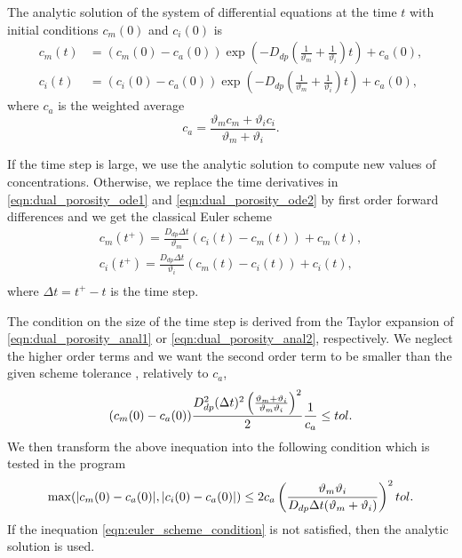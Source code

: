 The analytic solution of the system of differential equations at the time $t$ with initial conditions $c_m(0)$ and $c_i(0)$ is
\begin{align}
     c_m(t) &= (c_m(0) - c_a(0)) \exp\left(- D_{dp}\left(\frac{1}{\vartheta_m} + \frac{1}{\vartheta_i}\right) t \right) + c_a(0), 
     \label{eqn:dual_porosity_anal1}\\
     c_i(t) &= (c_i(0) - c_a(0)) \exp\left(- D_{dp}\left(\frac{1}{\vartheta_m} + \frac{1}{\vartheta_i}\right) t \right) + c_a(0),
     \label{eqn:dual_porosity_anal2}
\end{align}
where $c_a$ is the weighted average
\[
  c_a = \frac{\vartheta_m c_m + \vartheta_i c_i}{\vartheta_m + \vartheta_i}.
\]

If the time step is large, we use the analytic solution to compute new values of concentrations. 
Otherwise, we replace the time derivatives in \eqref{eqn:dual_porosity_ode1} and \eqref{eqn:dual_porosity_ode2} 
by first order forward differences and we get the classical Euler scheme
\begin{align}
  c_m(t^+) = \frac{D_{dp} \Delta t}{\vartheta_m}(c_i(t) - c_m(t)) + c_m(t), \\
  c_i(t^+) = \frac{D_{dp} \Delta t}{\vartheta_i}(c_m(t) - c_i(t)) + c_i(t), \\
\end{align}
where $\Delta t = t^+ - t$ is the time step. 

The condition on the size of the time step is derived from the Taylor expansion of 
\eqref{eqn:dual_porosity_anal1} or \eqref{eqn:dual_porosity_anal2}, respectively. We neglect the higher order 
terms and we want the second order term to be smaller than the given scheme tolerance 
, relatively to $c_a$,
\begin{equation}
  (c_m(0) - c_a(0))
  \frac{ D_{dp}^2 (\Delta t)^2 \left(\frac{\vartheta_m + \vartheta_i}{\vartheta_m \vartheta_i}\right)^2}{2}
  \frac{1}{c_a} \leq tol. \\
\end{equation}
We then transform the above inequation into the following condition which is tested in the program
\begin{equation} \label{eqn:euler_scheme_condition}
  \max(|c_m(0) - c_a(0)|, |c_i(0) - c_a(0)|) \leq 
  2 c_a \left(\frac{\vartheta_m \vartheta_i}{D_{dp} \Delta t (\vartheta_m + \vartheta_i)}\right)^2 tol. \\
\end{equation}
If the inequation \eqref{eqn:euler_scheme_condition} is not satisfied, then the analytic 
solution is used.
 

